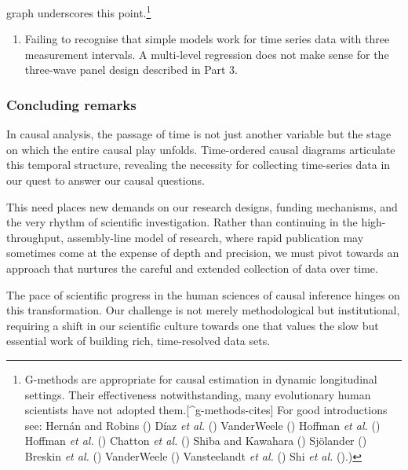 \documentclass[
  singlecolumn,
  9pt]{article}
\providecommand{\tightlist}{%
  \setlength{\itemsep}{0pt}\setlength{\parskip}{0pt}}\usepackage{longtable,booktabs,array}
\begin{document}
\begin{enumerate}
  graph underscores this point.\footnote{G-methods are appropriate for
    causal estimation in dynamic longitudinal settings. Their
    effectiveness notwithstanding, many evolutionary human scientists
    have not adopted them.{[}\^{}g-methods-cites{]} For good
    introductions see: Hernán and Robins
    () Díaz \emph{et al.}
    () VanderWeele
    () Hoffman \emph{et al.}
    () Hoffman \emph{et al.}
    () Chatton \emph{et al.}
    () Shiba and Kawahara
    () Sjölander
    () Breskin \emph{et al.}
    () VanderWeele
    () Vansteelandt \emph{et al.}
    () Shi \emph{et al.}
    ().)}
\end{enumerate}

\begin{enumerate}
\def\labelenumi{\arabic{enumi}.}
\setcounter{enumi}{11}
\tightlist
\item
  Failing to recognise that simple models work for time series data with
  three measurement intervals. A multi-level regression does not make
  sense for the three-wave panel design described in Part 3.
\end{enumerate}

\subsubsection{Concluding remarks}\label{concluding-remarks}

In causal analysis, the passage of time is not just another variable but
the stage on which the entire causal play unfolds. Time-ordered causal
diagrams articulate this temporal structure, revealing the necessity for
collecting time-series data in our quest to answer our causal questions.

This need places new demands on our research designs, funding
mechanisms, and the very rhythm of scientific investigation. Rather than
continuing in the high-throughput, assembly-line model of research,
where rapid publication may sometimes come at the expense of depth and
precision, we must pivot towards an approach that nurtures the careful
and extended collection of data over time.

The pace of scientific progress in the human sciences of causal
inference hinges on this transformation. Our challenge is not merely
methodological but institutional, requiring a shift in our scientific
culture towards one that values the slow but essential work of building
rich, time-resolved data sets.
\end{document}
